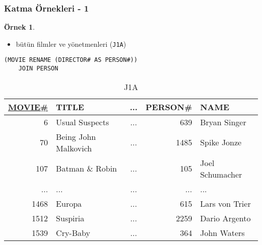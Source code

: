 \documentclass[dvipsnames]{beamer}
\theoremstyle{definition}
\theoremstyle{example}
\newtheorem{ornek}[theorem]{Örnek}
\theoremstyle{plain}
\begin{document}
\begin{frame}[fragile]
  \frametitle{Katma Örnekleri - 1}

  \begin{ornek}
    \begin{itemize}
      \item bütün filmler ve yönetmenleri (\texttt{J1A})
    \end{itemize}

    \begin{lstlisting}
(MOVIE RENAME (DIRECTOR# AS PERSON#))
    JOIN PERSON
    \end{lstlisting}

    \pause
    \vspace{-10pt}
    \begin{tiny}
    \begin{table}
      \caption{J1A}
      \begin{tabular}{|r|l|c|r|l|}\hline
\underline{MOVIE\#} & TITLE & ... & PERSON\# & NAME            \\[2pt]\hline\hline
   6 & Usual Suspects       & ... &     639  & Bryan Singer    \\\hline
  70 & Being John Malkovich & ... &    1485  & Spike Jonze     \\\hline
 107 & Batman \& Robin      & ... &     105  & Joel Schumacher \\\hline
 ... & ...                  & ... &     ...  & ...             \\\hline
1468 & Europa               & ... &     615  & Lars von Trier  \\\hline
1512 & Suspiria             & ... &    2259  & Dario Argento   \\\hline
1539 & Cry-Baby             & ... &     364  & John Waters     \\\hline
      \end{tabular}
    \end{table}
    \end{tiny}
  \end{ornek}
\end{frame}
\end{document}

